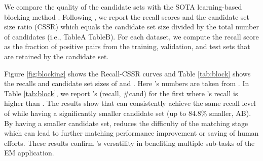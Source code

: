 We compare the quality of the candidate sets with the SOTA learning-based blocking method \dbl.
Following \cite{DBLP:journals/pvldb/ThirumuruganathanLTOGPFD21},
we report the recall scores and the candidate set size ratio (CSSR) which equals the candidate set size
divided by the total number of candidates (i.e., TableA  TableB).
For each dataset, we compute the recall score as the fraction
of positive pairs from the training, validation, and test sets 
that are retained by the candidate set.

Figure \ref{fig:blocking} shows the Recall-CSSR curves and
Table \ref{tab:block} shows the recalls and candidate set sizes of \dbl and \system. Here \dbl's numbers 
are taken from \cite{DBLP:journals/pvldb/ThirumuruganathanLTOGPFD21}.
In Table \ref{tab:block}, 
we report \system's (recall, \#cand) for the first  where 
\system's recall is higher than \dbl.
The results show that \system can consistently achieve the same recall level of \dbl while
having a significantly smaller candidate set (up to 84.8\% smaller, AB).
By having a smaller candidate set, \system reduces the difficulty of the matching stage 
which can lead to further 
matching performance improvement or 
saving of human efforts.
These results confirm \system's versatility in
benefiting multiple sub-tasks of the EM application.


\setlength{\tabcolsep}{2.3pt}
\begin{table}[ht]
\small
	\caption{\system for blocking. We report the recall score (R) and the number of candidates pairs (\#cand).}\label{tab:block}
\vspace{-6mm}
\end{table}












